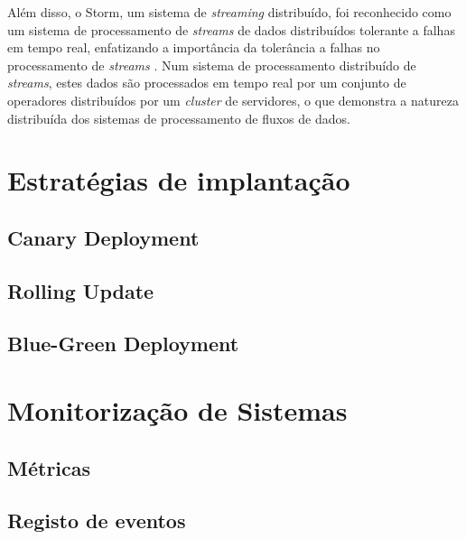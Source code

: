 Além disso, o Storm, um sistema de \textit{streaming} distribuído, foi reconhecido como um sistema de 
processamento de \textit{streams} de dados distribuídos tolerante a falhas em tempo real, enfatizando
a importância da tolerância a falhas no processamento de \textit{streams} \cite{stormattwitter}.
Num sistema de processamento distribuído de \textit{streams}, estes dados são processados em tempo real 
por um conjunto de operadores distribuídos por um \textit{cluster} de servidores, o que demonstra a 
natureza distribuída dos sistemas de processamento de fluxos de dados.

\section{Estratégias de implantação}


\subsection{Canary Deployment}


\subsection{Rolling Update}


\subsection{Blue-Green Deployment}


\section{Monitorização de Sistemas}


\subsection{Métricas}


\subsection{Registo de eventos}

